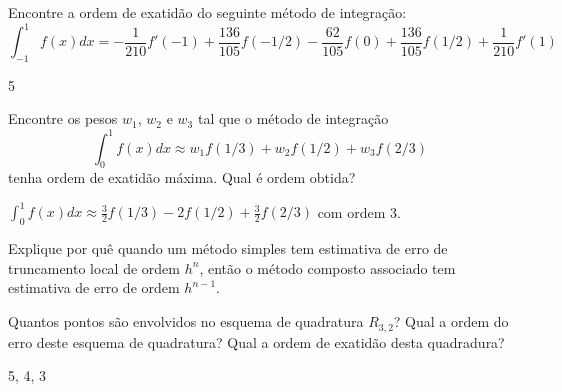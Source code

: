 \begin{Exercise} Encontre a ordem de exatidão do seguinte método de integração:
$$\int_{-1}^1f(x)dx=-\frac{1}{210}f'(-1)+\frac{136}{105} f(-1/2) - \frac{62}{105} f(0) + \frac{136}{105}f(1/2) +\frac{1}{210}f'(1)$$
\end{Exercise}
\begin{Answer}
  \begin{tiny}
5    
  \end{tiny}
\end{Answer}
\begin{Exercise} Encontre os pesos $w_1$, $w_2$ e $w_3$ tal que o método de integração
$$\int_0^1 f(x)dx \approx w_1 f(1/3)  + w_2f(1/2) + w_3f(2/3)$$
tenha ordem de exatidão máxima. Qual é ordem obtida?
\end{Exercise}

\begin{Answer}
  \begin{tiny}
$\int_0^1 f(x)dx \approx \frac{3}{2} f(1/3)  -2f(1/2) + \frac{3}{2}f(2/3)$ com ordem 3.    
  \end{tiny}
\end{Answer}



\begin{Exercise} Explique por quê quando um método simples tem estimativa de erro de truncamento local de ordem $h^n$, então o método composto associado tem estimativa de erro de ordem $h^{n-1}$.
\end{Exercise}


\begin{Exercise} Quantos pontos são envolvidos no esquema de quadratura $R_{3,2}$? Qual a ordem do erro deste esquema de quadratura? Qual a ordem de exatidão desta quadradura?
\end{Exercise}
\begin{Answer}
  \begin{tiny}
 5, 4, 3    
  \end{tiny}
\end{Answer}





%

